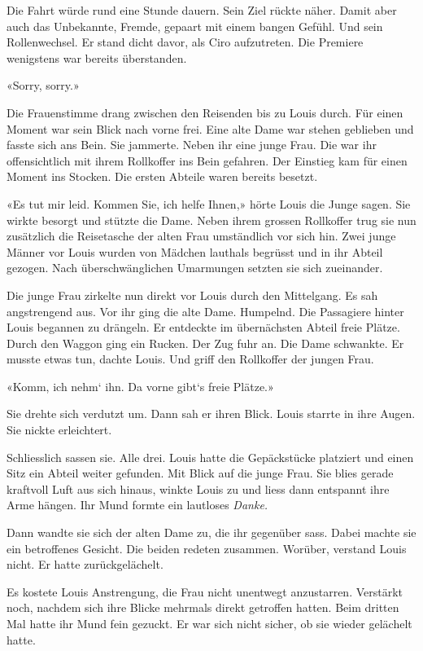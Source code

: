Die Fahrt würde rund eine Stunde dauern. Sein Ziel rückte näher. Damit
aber auch das Unbekannte, Fremde, gepaart mit einem bangen Gefühl. Und
sein Rollenwechsel. Er stand dicht davor, als Ciro aufzutreten. Die
Premiere wenigstens war bereits überstanden.

«Sorry, sorry.»

Die Frauenstimme drang zwischen den Reisenden bis zu Louis durch. Für
einen Moment war sein Blick nach vorne frei. Eine alte Dame war stehen
geblieben und fasste sich ans Bein. Sie jammerte. Neben ihr eine junge
Frau. Die war ihr offensichtlich mit ihrem Rollkoffer ins Bein gefahren.
Der Einstieg kam für einen Moment ins Stocken. Die ersten Abteile waren
bereits besetzt.

«Es tut mir leid. Kommen Sie, ich helfe Ihnen,» hörte Louis die Junge
sagen. Sie wirkte besorgt und stützte die Dame. Neben ihrem grossen
Rollkoffer trug sie nun zusätzlich die Reisetasche der alten Frau
umständlich vor sich hin. Zwei junge Männer vor Louis wurden von Mädchen
lauthals begrüsst und in ihr Abteil gezogen. Nach überschwänglichen
Umarmungen setzten sie sich zueinander.

Die junge Frau zirkelte nun direkt vor Louis durch den Mittelgang. Es
sah angstrengend aus. Vor ihr ging die alte Dame. Humpelnd. Die
Passagiere hinter Louis begannen zu drängeln. Er entdeckte im
übernächsten Abteil freie Plätze. Durch den Waggon ging ein Rucken. Der
Zug fuhr an. Die Dame schwankte. Er musste etwas tun, dachte Louis. Und
griff den Rollkoffer der jungen Frau.

«Komm, ich nehm` ihn. Da vorne gibt`s freie Plätze.»

Sie drehte sich verdutzt um. Dann sah er ihren Blick. Louis starrte in
ihre Augen. Sie nickte erleichtert.

Schliesslich sassen sie. Alle drei. Louis hatte die Gepäckstücke
platziert und einen Sitz ein Abteil weiter gefunden. Mit Blick auf die
junge Frau. Sie blies gerade kraftvoll Luft aus sich hinaus, winkte
Louis zu und liess dann entspannt ihre Arme hängen. Ihr Mund formte ein
lautloses \emph{Danke.}

Dann wandte sie sich der alten Dame zu, die ihr gegenüber sass. Dabei
machte sie ein betroffenes Gesicht. Die beiden redeten zusammen.
Worüber, verstand Louis nicht. Er hatte zurückgelächelt.

Es kostete Louis Anstrengung, die Frau nicht unentwegt anzustarren.
Verstärkt noch, nachdem sich ihre Blicke mehrmals direkt getroffen
hatten. Beim dritten Mal hatte ihr Mund fein gezuckt. Er war sich nicht
sicher, ob sie wieder gelächelt hatte.

